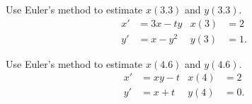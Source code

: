 \begin{applicationActivities}
\begin{activity}{10}
Use Euler's method to estimate \(x(3.3)\) and \(y(3.3)\).
\begin{align*}
x' &= 3x-ty & x(3)&=2 \\
y' &= x-y^2 & y(3)&=1 .
\end{align*}
\end{activity}

\begin{activity}{10}
Use Euler's method to estimate \(x(4.6)\) and \(y(4.6)\).
\begin{align*}
x' &= xy-t & x(4)&=2 \\
y' &= x+t & y(4)&=0 .
\end{align*}
\end{activity}


\end{applicationActivities}
